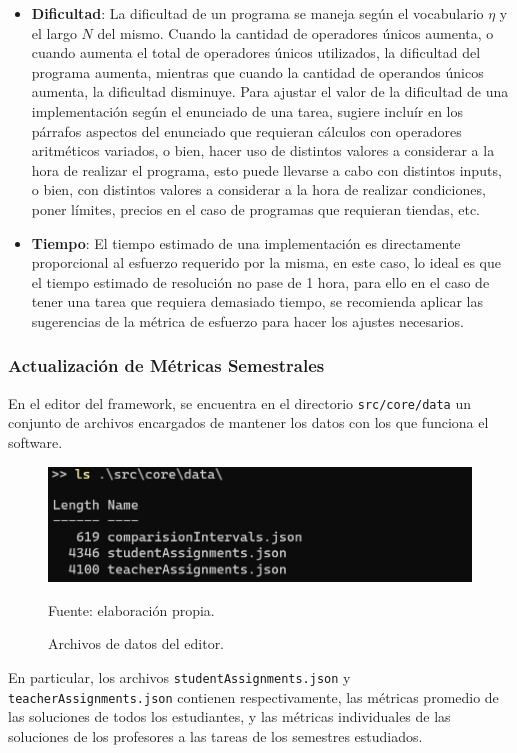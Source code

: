 \documentclass[letterpaper,12pt]{article}
\begin{document}
\begin{itemize}
  \item \textbf{Dificultad}: La dificultad de un programa se maneja según el vocabulario $\eta$ y el largo $N$ del mismo. Cuando la cantidad de operadores únicos aumenta, o cuando aumenta el total de operadores únicos utilizados, la dificultad del programa aumenta, mientras que cuando la cantidad de operandos únicos aumenta, la dificultad disminuye. Para ajustar el valor de la dificultad de una implementación según el enunciado de una tarea, sugiere incluír en los párrafos aspectos del enunciado que requieran cálculos con operadores aritméticos variados, o bien, hacer uso de distintos valores a considerar a la hora de realizar el programa, esto puede llevarse a cabo con distintos inputs, o bien, con distintos valores a considerar a la hora de realizar condiciones, poner límites, precios en el caso de programas que requieran tiendas, etc.
  \item \textbf{Tiempo}: El tiempo estimado de una implementación es directamente proporcional al esfuerzo requerido por la misma, en este caso, lo ideal es que el tiempo estimado de resolución no pase de 1 hora, para ello en el caso de tener una tarea que requiera demasiado tiempo, se recomienda aplicar las sugerencias de la métrica de esfuerzo para hacer los ajustes necesarios.
\end{itemize}

\subsubsection{Actualización de Métricas Semestrales} \label{sssec:metricsUpdate}

En el editor del framework, se encuentra en el directorio \texttt{src/core/data} un conjunto de archivos encargados de mantener los datos con los que funciona el software.
\begin{figure}[H]
  \centering
  \includegraphics[width=1\textwidth]{figures/datafiles.png}
  \caption{Archivos de datos del editor.} Fuente: elaboración propia.
  \label{datafiles}
\end{figure}
En particular, los archivos \texttt{studentAssignments.json} y \texttt{teacherAssignments.json} contienen respectivamente, las métricas promedio de las soluciones de todos los estudiantes, y las métricas individuales de las soluciones de los profesores a las tareas de los semestres estudiados.
\end{document}
